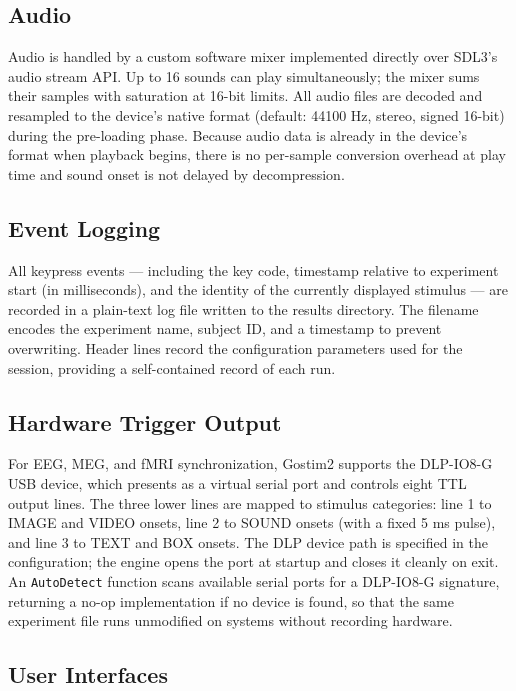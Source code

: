 \documentclass[
  11pt,
]{article}
\begin{document}
\subsection{Audio}\label{audio}

Audio is handled by a custom software mixer implemented directly over
SDL3's audio stream API. Up to 16 sounds can play simultaneously; the
mixer sums their samples with saturation at 16-bit limits. All audio
files are decoded and resampled to the device's native format (default:
44100 Hz, stereo, signed 16-bit) during the pre-loading phase. Because
audio data is already in the device's format when playback begins, there
is no per-sample conversion overhead at play time and sound onset is not
delayed by decompression.

\subsection{Event Logging}\label{event-logging}

All keypress events --- including the key code, timestamp relative to
experiment start (in milliseconds), and the identity of the currently
displayed stimulus --- are recorded in a plain-text log file written to
the results directory. The filename encodes the experiment name, subject
ID, and a timestamp to prevent overwriting. Header lines record the
configuration parameters used for the session, providing a
self-contained record of each run.

\subsection{Hardware Trigger Output}\label{hardware-trigger-output}

For EEG, MEG, and fMRI synchronization, Gostim2 supports the DLP-IO8-G
USB device, which presents as a virtual serial port and controls eight
TTL output lines. The three lower lines are mapped to stimulus
categories: line 1 to IMAGE and VIDEO onsets, line 2 to SOUND onsets
(with a fixed 5 ms pulse), and line 3 to TEXT and BOX onsets. The DLP
device path is specified in the configuration; the engine opens the port
at startup and closes it cleanly on exit. An \texttt{AutoDetect}
function scans available serial ports for a DLP-IO8-G signature,
returning a no-op implementation if no device is found, so that the same
experiment file runs unmodified on systems without recording hardware.

\subsection{User Interfaces}\label{user-interfaces}
\end{document}
